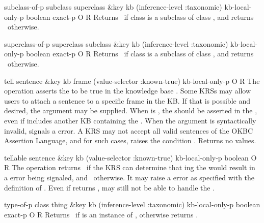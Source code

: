 \begin{okbcop}{subclass-of-p}{ subclass superclass \&key kb (inference-level :taxonomic) kb-local-only-p} { boolean exact-p } { O } { R } {  }
Returns \true\ if class  is a subclass of class 
   , and returns \false\ otherwise.
\end{okbcop}

\begin{okbcop}{superclass-of-p}{ superclass subclass \&key kb (inference-level :taxonomic) kb-local-only-p} { boolean exact-p } { O } { R } {  }
Returns \true\ if class  is a subclass of class
   , and returns \false\ otherwise.
\end{okbcop}

\begin{okbcop}{tell}{ sentence \&key kb frame (value-selector :known-true) kb-local-only-p} { \void } { O } { R } {  }
The  operation asserts the  to be true in
   the knowledge base .  Some KRSs may allow users to attach a
   sentence to a specific frame in the KB.  If that is possible and desired, 
   the  argument may be supplied.  When 
   is \true, the  should be asserted in the , even
   if  includes another KB containing the .  When the
    argument is syntactically invalid,  signals
   a  error.  A KRS may not accept all valid sentences
   of the OKBC Assertion Language, and for such cases,  raises the
   condition .  Returns no values.
\end{okbcop}

\begin{okbcop}{tellable}{ sentence \&key kb (value-selector :known-true) kb-local-only-p} { boolean } { O } { R } {  }
The  operation returns \false\ if the KRS can
   determine that ing the  would result in a
    error being signaled, and \true\ otherwise.
   It may raise a  error as specified with the
   definition of .  Even if  returns
   \true,  may still not be able to handle the
   . 
\end{okbcop}

\begin{okbcop}{type-of-p}{ class thing \&key kb (inference-level :taxonomic) kb-local-only-p} { boolean exact-p } { O } { R } {  }
Returns \true\ if  is an instance of , otherwise
   returns \false.
\end{okbcop}

